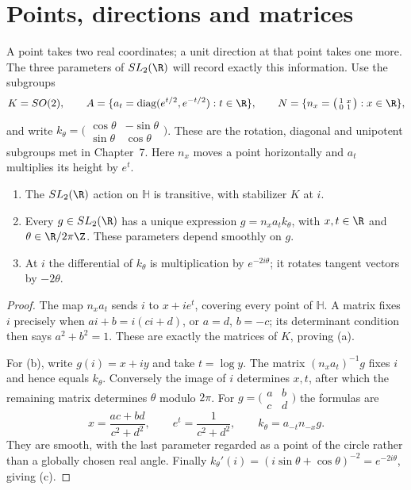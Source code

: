 \section{Points, directions and matrices}

A point takes two real coordinates; a unit direction at that point takes one more. The three parameters of $SL_2(\R)$ will record exactly this information. Use the subgroups
\[
K=SO(2),\qquad
A=\{a_t=\operatorname{diag}(e^{t/2},e^{-t/2}):t\in\R\},\qquad
N=\{n_x=\bigl(\begin{smallmatrix}1&x\\0&1\end{smallmatrix}\bigr):x\in\R\},
\]
and write $k_\theta=\bigl(\begin{smallmatrix}\cos\theta&-\sin\theta\\\sin\theta&\cos\theta\end{smallmatrix}\bigr)$. These are the rotation, diagonal and unipotent subgroups met in Chapter~7. Here $n_x$ moves a point horizontally and $a_t$ multiplies its height by $e^t$.

\begin{theorem}\label{thm:iwasawa}
\begin{enumerate}
\item[(a)] The $SL_2(\R)$ action on $\mathbb H$ is transitive, with stabilizer $K$ at $i$.
\item[(b)] Every $g\in SL_2(\R)$ has a unique expression $g=n_xa_tk_\theta$, with $x,t\in\R$ and $\theta\in\R/2\pi\Z$. These parameters depend smoothly on $g$.
\item[(c)] At $i$ the differential of $k_\theta$ is multiplication by $e^{-2i\theta}$; it rotates tangent vectors by $-2\theta$.
\end{enumerate}
\end{theorem}

\begin{proof}
The map $n_xa_t$ sends $i$ to $x+ie^t$, covering every point of $\mathbb H$. A matrix fixes $i$ precisely when $ai+b=i(ci+d)$, or $a=d$, $b=-c$; its determinant condition then says $a^2+b^2=1$. These are exactly the matrices of $K$, proving (a).

For (b), write $g(i)=x+iy$ and take $t=\log y$. The matrix $(n_xa_t)^{-1}g$ fixes $i$ and hence equals $k_\theta$. Conversely the image of $i$ determines $x,t$, after which the remaining matrix determines $\theta$ modulo $2\pi$. For $g=\bigl(\begin{smallmatrix}a&b\\c&d\end{smallmatrix}\bigr)$ the formulas are
\[
x=\frac{ac+bd}{c^2+d^2},\qquad e^t=\frac1{c^2+d^2},\qquad k_\theta=a_{-t}n_{-x}g.
\]
They are smooth, with the last parameter regarded as a point of the circle rather than a globally chosen real angle. Finally $k_\theta'(i)=(i\sin\theta+\cos\theta)^{-2}=e^{-2i\theta}$, giving (c).
\end{proof}

